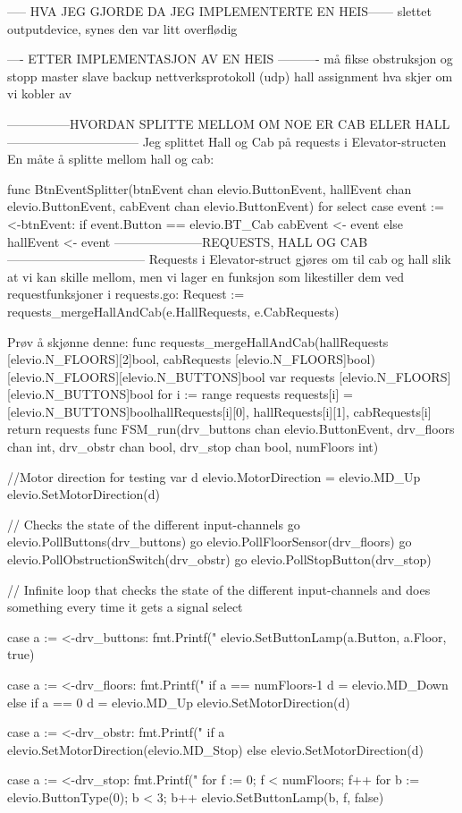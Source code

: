 ----- HVA JEG GJORDE DA JEG IMPLEMENTERTE EN HEIS------
slettet outputdevice, synes den var litt overflødig

---- ETTER IMPLEMENTASJON AV EN HEIS ----------
må fikse obstruksjon og stopp
master slave
backup
nettverksprotokoll (udp)
hall assignment
hva skjer om vi kobler av


---------------HVORDAN SPLITTE MELLOM OM NOE ER CAB ELLER HALL--------------------------------
Jeg splittet Hall og Cab på requests i Elevator-structen
En måte å splitte mellom hall og cab:

func BtnEventSplitter(btnEvent chan elevio.ButtonEvent,
	hallEvent chan elevio.ButtonEvent,
	cabEvent chan elevio.ButtonEvent) {
	for {
		select {
		case event := <-btnEvent:
			if event.Button == elevio.BT_Cab {
				cabEvent <- event
			} else {
				hallEvent <- event
			}
		}
	}
}
---------------------REQUESTS, HALL OG CAB---------------------------------
Requests i Elevator-struct gjøres om til cab og hall slik at vi kan skille mellom, men vi lager en funksjon 
som likestiller dem ved requestfunksjoner i requests.go:
Request := requests_mergeHallAndCab(e.HallRequests, e.CabRequests)

Prøv å skjønne denne: 
func requests_mergeHallAndCab(hallRequests [elevio.N_FLOORS][2]bool, cabRequests [elevio.N_FLOORS]bool) [elevio.N_FLOORS][elevio.N_BUTTONS]bool {
	var requests [elevio.N_FLOORS][elevio.N_BUTTONS]bool
	for i := range requests {
		requests[i] = [elevio.N_BUTTONS]bool{hallRequests[i][0], hallRequests[i][1], cabRequests[i]}
	}
	return requests
}
func FSM_run(drv_buttons chan elevio.ButtonEvent, drv_floors chan int, drv_obstr chan bool, drv_stop chan bool, numFloors int) {

	//Motor direction for testing
	var d elevio.MotorDirection = elevio.MD_Up
	elevio.SetMotorDirection(d)


	// Checks the state of the different input-channels
	go elevio.PollButtons(drv_buttons)
	go elevio.PollFloorSensor(drv_floors)
	go elevio.PollObstructionSwitch(drv_obstr)
	go elevio.PollStopButton(drv_stop)

	// Infinite loop that checks the state of the different input-channels and does something every time it gets a signal
	select {
	case a := <-drv_buttons:
		fmt.Printf("%
		elevio.SetButtonLamp(a.Button, a.Floor, true)

	case a := <-drv_floors:
		fmt.Printf("%
		if a == numFloors-1 {
			d = elevio.MD_Down
		} else if a == 0 {
			d = elevio.MD_Up
		}
		elevio.SetMotorDirection(d)

	case a := <-drv_obstr:
		fmt.Printf("%
		if a {
			elevio.SetMotorDirection(elevio.MD_Stop)
		} else {
			elevio.SetMotorDirection(d)
		}

	case a := <-drv_stop:
		fmt.Printf("%
		for f := 0; f < numFloors; f++ {
			for b := elevio.ButtonType(0); b < 3; b++ {
				elevio.SetButtonLamp(b, f, false)
			}
		}
	}

}

